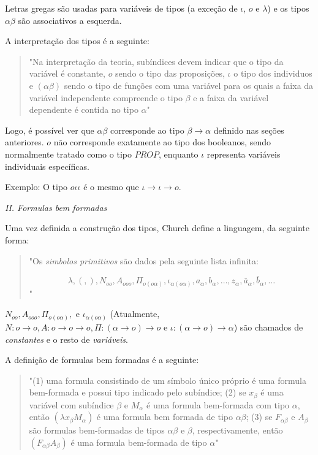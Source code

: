 \documentclass[../main.tex]{subfiles}
\begin{document}
Letras gregas são usadas para variáveis de tipos (a exceção de $\iota$, $o$ e $\lambda$) e os tipos $\alpha\beta$ são associativos a esquerda.

A interpretação dos tipos é a seguinte:

\begin{quote}
    "Na interpretação da teoria, subíndices devem indicar que o tipo da variável é constante, $o$ sendo o tipo das proposições, $\iota$ o tipo dos individuos e $(\alpha\beta)$ sendo o tipo de funções com uma variável para os quais a faixa da variável independente compreende o tipo $\beta$ e a faixa da variável dependente é contida no tipo $\alpha$"
    \cite[p. 57]{church1940}
\end{quote}

Logo, é possível ver que $\alpha\beta$ corresponde ao tipo $\beta \to \alpha$ definido nas seções anteriores. $o$ não corresponde exatamente ao tipo dos booleanos, sendo normalmente tratado como o tipo $PROP$, enquanto $\iota$ representa variáveis individuais específicas.

Exemplo: O tipo $o\iota\iota$ é o mesmo que $\iota \to \iota \to o$.

\emph{II. Formulas bem formadas}

Uma vez definida a construção dos tipos, Church define a linguagem, da seguinte forma:

\begin{quote}
    "Os \emph{simbolos primitivos} são dados pela seguinte lista infinita:

    $$\lambda, (, ), N_{oo}, A_{ooo}, \Pi_{o(o\alpha)}, \iota_{\alpha(o\alpha)}, a_{\alpha}, b_{\alpha}, \dots, z_{\alpha}, \bar{a}_{\alpha}, \bar{b}_{\alpha}, \dots$$ "
    \cite[p. 57]{church1940}
\end{quote}


$N_{oo}, A_{ooo}, \Pi_{o(o\alpha)},$ e $\iota_{\alpha(o\alpha)}$ (Atualmente, $N : o \to o, A: o \to o \to o, \Pi : (\alpha \to o) \to o$ e $\iota : (\alpha \to o) \to \alpha$) são chamados de \emph{constantes} e o resto de \emph{variáveis}.

A definição de formulas bem formadas é a seguinte:

\begin{quote}
    "(1) uma formula consistindo de um símbolo único próprio é uma formula bem-formada e possui tipo indicado pelo subíndice; (2) se $x_{\beta}$ é uma variável com subíndice $\beta$ e $M_{\alpha}$ é uma formula bem-formada com tipo $\alpha$, então $(\lambda x_{\beta} M_{\alpha})$ é uma formula bem formada de tipo $\alpha\beta$; (3) se $F_{\alpha\beta}$ e $A_{\beta}$ são formulas bem-formadas de tipos $\alpha\beta$ e $\beta$, respectivamente, então $(F_{\alpha\beta}A_{\beta})$ é uma formula bem-formada de tipo $\alpha$"
    \cite[p. 57]{church1940}
\end{quote}
\end{document}
